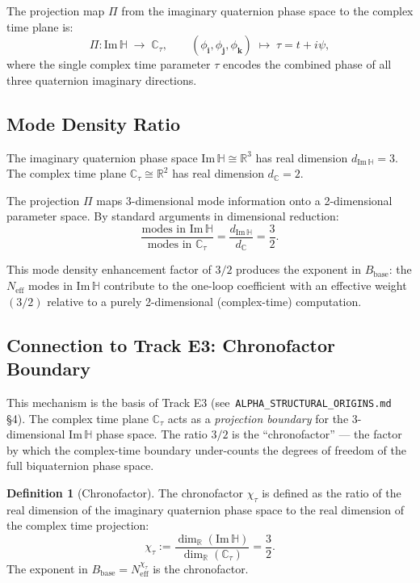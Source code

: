 \documentclass[12pt,a4paper]{article}
\theoremstyle{definition}
\newtheorem{definition}[theorem]{Definition}
\theoremstyle{remark}
\begin{document}
The projection map $\Pi$ from the imaginary quaternion phase space to the
complex time plane is:
\begin{equation}
  \Pi: \mathrm{Im}\,\mathbb{H} \;\longrightarrow\; \mathbb{C}_\tau,
  \qquad
  (\phi_\mathbf{i}, \phi_\mathbf{j}, \phi_\mathbf{k})
  \;\longmapsto\; \tau = t + i\psi,
  \label{eq:exp32:Pi}
\end{equation}
where the single complex time parameter $\tau$ encodes the combined phase of all
three quaternion imaginary directions.

\subsection{Mode Density Ratio}
\label{ssec:exp32:proj:density}

The imaginary quaternion phase space $\mathrm{Im}\,\mathbb{H} \cong \mathbb{R}^3$
has real dimension $d_{\mathrm{Im}\,\mathbb{H}} = 3$.
The complex time plane $\mathbb{C}_\tau \cong \mathbb{R}^2$ has real dimension
$d_{\mathbb{C}} = 2$.

The projection $\Pi$ maps 3-dimensional mode information onto a 2-dimensional
parameter space.  By standard arguments in dimensional reduction:
\begin{equation}
  \frac{\text{modes in Im}\,\mathbb{H}}{\text{modes in }\mathbb{C}_\tau}
  = \frac{d_{\mathrm{Im}\,\mathbb{H}}}{d_{\mathbb{C}}}
  = \frac{3}{2}.
  \label{eq:exp32:ratio}
\end{equation}

This mode density enhancement factor of $3/2$ produces the exponent in $B_{\mathrm{base}}$:
the $N_{\mathrm{eff}}$ modes in Im$\,\mathbb{H}$ contribute to the one-loop
coefficient with an effective weight $(3/2)$ relative to a purely 2-dimensional
(complex-time) computation.

\subsection{Connection to Track E3: Chronofactor Boundary}
\label{ssec:exp32:proj:E3}

This mechanism is the basis of Track E3 (see~\texttt{ALPHA\_STRUCTURAL\_ORIGINS.md} \S4).
The complex time plane $\mathbb{C}_\tau$ acts as a \emph{projection boundary} for
the 3-dimensional Im$\,\mathbb{H}$ phase space.  The ratio $3/2$ is the
``chronofactor'' — the factor by which the complex-time boundary under-counts
the degrees of freedom of the full biquaternion phase space.

\begin{definition}[Chronofactor]
\label{def:exp32:chronofactor}
The chronofactor $\chi_\tau$ is defined as the ratio of the real dimension of the
imaginary quaternion phase space to the real dimension of the complex time projection:
\begin{equation}
  \chi_\tau
  := \frac{\dim_\mathbb{R}(\mathrm{Im}\,\mathbb{H})}{\dim_\mathbb{R}(\mathbb{C}_\tau)}
  = \frac{3}{2}.
  \label{eq:exp32:chronofactor}
\end{equation}
The exponent in $B_{\mathrm{base}} = N_{\mathrm{eff}}^{\chi_\tau}$ is the chronofactor.
\end{definition}
\end{document}
